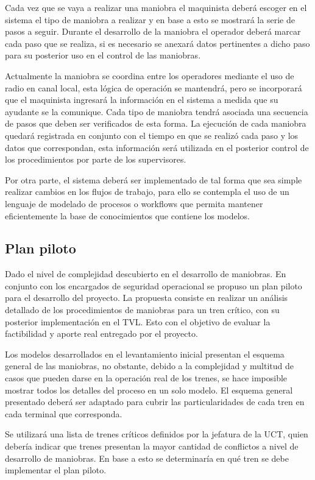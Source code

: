\documentclass[oneside,12pt, letterpaper, titlepage]{book}
\begin{document}
Cada vez que se vaya a realizar una maniobra el maquinista deberá escoger en el sistema el tipo de maniobra a realizar y en base a esto se mostrará la serie de pasos a seguir. Durante el desarrollo de la maniobra el operador deberá marcar cada paso que se realiza, si es necesario se anexará datos pertinentes a dicho paso para su posterior uso en el control de las maniobras. 

Actualmente la maniobra se coordina entre los operadores mediante el uso de radio en canal local, esta lógica de operación se mantendrá, pero se incorporará que el maquinista ingresará la información en el sistema a medida que su ayudante se la comunique. Cada tipo de maniobra tendrá asociada una secuencia de pasos que deben ser verificados de esta forma. La ejecución de cada maniobra quedará registrada en conjunto con el tiempo en que se realizó cada paso y los datos que correspondan, esta información será utilizada en el posterior control de los procedimientos por parte de los supervisores.

Por otra parte, el sistema deberá ser implementado de tal forma que sea simple realizar cambios en los flujos de trabajo, para ello se contempla el uso de un lenguaje de modelado de procesos o workflows que permita mantener eficientemente la base de conocimientos que contiene los modelos.

\subsection{Plan piloto}
Dado el nivel de complejidad descubierto en el desarrollo de maniobras. En conjunto con los encargados de seguridad operacional se propuso un plan piloto para el desarrollo del proyecto. La propuesta consiste en realizar un análisis detallado de los procedimientos de maniobras para un tren crítico, con su posterior implementación en el TVL. Esto con el objetivo de evaluar la factibilidad y aporte real entregado por el proyecto.

Los modelos desarrollados en el levantamiento inicial presentan el esquema general de las maniobras, no obstante, debido a la complejidad y multitud de casos que pueden darse en la operación real de los trenes, se hace imposible mostrar todos los detalles del proceso en un solo modelo. El esquema general presentado deberá ser adaptado para cubrir las particularidades de cada tren en cada terminal que corresponda.

Se utilizará una lista de trenes críticos definidos por la jefatura de la UCT, quien debería indicar que trenes presentan la mayor cantidad de conflictos a nivel de desarrollo de maniobras. En base a esto se determinaría en qué tren se debe implementar el plan piloto.
\end{document}
